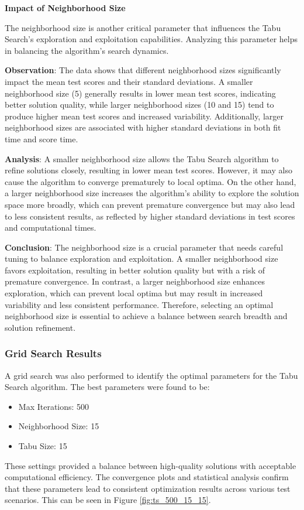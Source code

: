 \documentclass{article}
\begin{document}
    \textbf{Impact of Neighborhood Size}

    The neighborhood size is another critical parameter that influences the Tabu Search’s exploration and exploitation capabilities. Analyzing this parameter helps in balancing the algorithm’s search dynamics.

    \textbf{Observation}: The data shows that different neighborhood sizes significantly impact the mean test scores and their standard deviations. A smaller neighborhood size (5) generally results in lower mean test scores, indicating better solution quality, while larger neighborhood sizes (10 and 15) tend to produce higher mean test scores and increased variability. Additionally, larger neighborhood sizes are associated with higher standard deviations in both fit time and score time.

    \textbf{Analysis}: A smaller neighborhood size allows the Tabu Search algorithm to refine solutions closely, resulting in lower mean test scores. However, it may also cause the algorithm to converge prematurely to local optima. On the other hand, a larger neighborhood size increases the algorithm's ability to explore the solution space more broadly, which can prevent premature convergence but may also lead to less consistent results, as reflected by higher standard deviations in test scores and computational times.

    \textbf{Conclusion}: The neighborhood size is a crucial parameter that needs careful tuning to balance exploration and exploitation. A smaller neighborhood size favors exploitation, resulting in better solution quality but with a risk of premature convergence. In contrast, a larger neighborhood size enhances exploration, which can prevent local optima but may result in increased variability and less consistent performance. Therefore, selecting an optimal neighborhood size is essential to achieve a balance between search breadth and solution refinement.

    \subsubsection{Grid Search Results}
    A grid search was also performed to identify the optimal parameters for the Tabu Search algorithm. The best parameters were found to be:
    \begin{itemize}
        \item Max Iterations: 500
        \item Neighborhood Size: 15
        \item Tabu Size: 15
    \end{itemize}
    These settings provided a balance between high-quality solutions with acceptable computational efficiency. The convergence plots and statistical analysis confirm that these parameters lead to consistent optimization results across various test scenarios. This can be seen in Figure \ref{fig:ts_500_15_15}.
\end{document}
